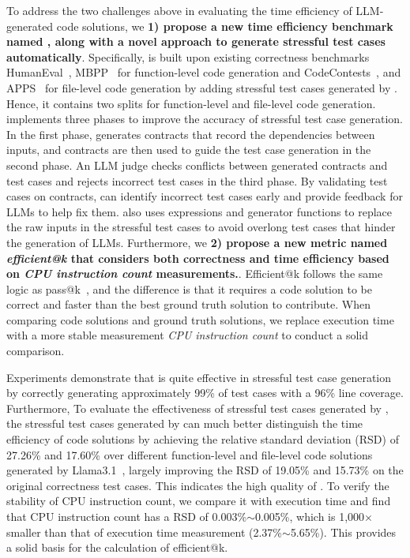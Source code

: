 To address the two challenges above in evaluating the time efficiency of LLM-generated code solutions, we \textbf{1) propose a new time efficiency benchmark named \bench, along with a novel approach \tool to generate stressful test cases automatically}. 
Specifically, \bench is built upon existing correctness benchmarks HumanEval~\cite{humaneval}, MBPP~\cite{mbpp} for function-level code generation and CodeContests~\cite{codecontests}, and APPS~\cite{apps} for file-level code generation by adding stressful test cases generated by \tool. Hence, it contains two splits for function-level and file-level code generation. \tool implements three phases to improve the accuracy of stressful test case generation. In the first phase, \tool generates contracts that record the dependencies between inputs, and contracts are then used to guide the test case generation in the second phase. An LLM judge checks conflicts between generated contracts and test cases and rejects incorrect test cases in the third phase. By validating test cases on contracts, \tool can identify incorrect test cases early and provide feedback for LLMs to help fix them. \tool also uses expressions and generator functions to replace the raw inputs in the stressful test cases to avoid overlong test cases that hinder the generation of LLMs. 
Furthermore, we \textbf{2) propose a new metric named \textit{efficient@k} that considers both correctness and time efficiency based on \textit{CPU instruction count} measurements.}. Efficient@k follows the same logic as pass@k~\cite{humaneval}, and the difference is that it requires a code solution to be correct and faster than the best ground truth solution to contribute. When comparing code solutions and ground truth solutions, we replace execution time with a more stable measurement \textit{CPU instruction count} to conduct a solid comparison.

Experiments demonstrate that \tool is quite effective in stressful test case generation by correctly generating approximately 99\% of test cases with a 96\% line coverage. Furthermore, 
To evaluate the effectiveness of stressful test cases generated by \tool, the stressful test cases generated by \tool can much better distinguish the time efficiency of code solutions by achieving the relative standard deviation (RSD) of 27.26\% and 17.60\% over different function-level and file-level code solutions generated by Llama3.1~\cite{llama31}, largely improving the RSD of 19.05\% and 15.73\% on the original correctness test cases. This indicates the high quality of \bench. To verify the stability of CPU instruction count, we compare it with execution time and find that CPU instruction count has a RSD of 0.003\%$\sim$0.005\%, which is 1,000$\times$ smaller than that of execution time measurement (2.37\%$\sim$5.65\%). This provides a solid basis for the calculation of efficient@k.

